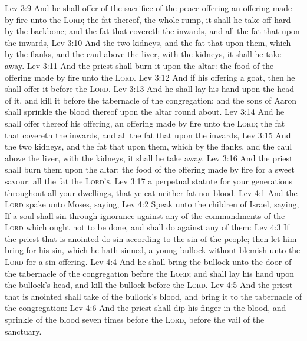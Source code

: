 \vs Lev 3:9 And he shall offer of the sacrifice of the peace offering an offering made by fire unto the \textsc{Lord}; the fat thereof,  the whole rump, it shall he take off hard by the backbone; and the fat that covereth the inwards, and all the fat that  upon the inwards,
\vs Lev 3:10 And the two kidneys, and the fat that  upon them, which  by the flanks, and the caul above the liver, with the kidneys, it shall he take away.
\vs Lev 3:11 And the priest shall burn it upon the altar:  the food of the offering made by fire unto the \textsc{Lord}.
\vs Lev 3:12 And if his offering  a goat, then he shall offer it before the \textsc{Lord}.
\vs Lev 3:13 And he shall lay his hand upon the head of it, and kill it before the tabernacle of the congregation: and the sons of Aaron shall sprinkle the blood thereof upon the altar round about.
\vs Lev 3:14 And he shall offer thereof his offering,  an offering made by fire unto the \textsc{Lord}; the fat that covereth the inwards, and all the fat that  upon the inwards,
\vs Lev 3:15 And the two kidneys, and the fat that  upon them, which  by the flanks, and the caul above the liver, with the kidneys, it shall he take away.
\vs Lev 3:16 And the priest shall burn them upon the altar:  the food of the offering made by fire for a sweet savour: all the fat  the \textsc{Lord's}.
\vs Lev 3:17  a perpetual statute for your generations throughout all your dwellings, that ye eat neither fat nor blood.
\vs Lev 4:1 And the \textsc{Lord} spake unto Moses, saying,
\vs Lev 4:2 Speak unto the children of Israel, saying, If a soul shall sin through ignorance against any of the commandments of the \textsc{Lord}  which ought not to be done, and shall do against any of them:
\vs Lev 4:3 If the priest that is anointed do sin according to the sin of the people; then let him bring for his sin, which he hath sinned, a young bullock without blemish unto the \textsc{Lord} for a sin offering.
\vs Lev 4:4 And he shall bring the bullock unto the door of the tabernacle of the congregation before the \textsc{Lord}; and shall lay his hand upon the bullock's head, and kill the bullock before the \textsc{Lord}.
\vs Lev 4:5 And the priest that is anointed shall take of the bullock's blood, and bring it to the tabernacle of the congregation:
\vs Lev 4:6 And the priest shall dip his finger in the blood, and sprinkle of the blood seven times before the \textsc{Lord}, before the vail of the sanctuary.
